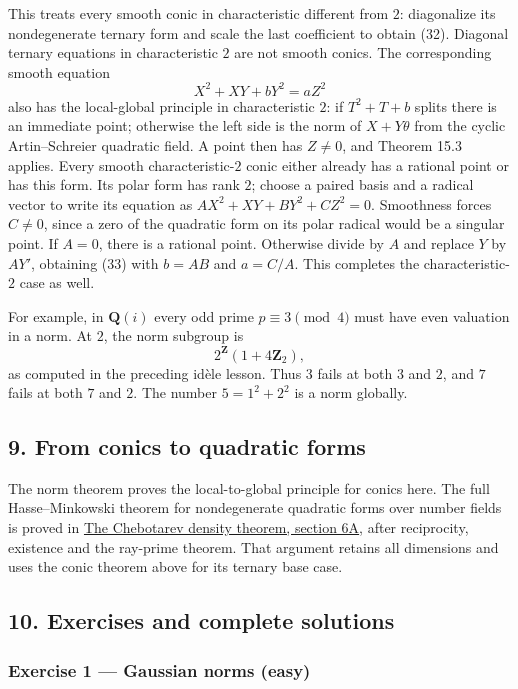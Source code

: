 \documentclass[11pt,a4paper]{article}
\begin{document}
This treats every smooth conic in characteristic different from \(2\):
diagonalize its nondegenerate ternary form and scale the last
coefficient to obtain (32). Diagonal ternary equations in characteristic
\(2\) are not smooth conics. The corresponding smooth equation \[
X^2+XY+bY^2=aZ^2
\tag{33}
\] also has the local-global principle in characteristic \(2\): if
\(T^2+T+b\) splits there is an immediate point; otherwise the left side
is the norm of \(X+Y\theta\) from the cyclic Artin--Schreier quadratic
field. A point then has \(Z\ne0\), and Theorem 15.3 applies. Every
smooth characteristic-\(2\) conic either already has a rational point or
has this form. Its polar form has rank \(2\); choose a paired basis and
a radical vector to write its equation as \(A X^2+XY+B Y^2+C Z^2=0\).
Smoothness forces \(C\ne0\), since a zero of the quadratic form on its
polar radical would be a singular point. If \(A=0\), there is a rational
point. Otherwise divide by \(A\) and replace \(Y\) by \(A Y'\),
obtaining (33) with \(b=AB\) and \(a=C/A\). This completes the
characteristic-\(2\) case as well.

For example, in \(\mathbf Q(i)\) every odd prime \(p\equiv3\pmod4\) must
have even valuation in a norm. At \(2\), the norm subgroup is \[
2^{\mathbf Z}(1+4\mathbf Z_2),
\] as computed in the preceding idèle lesson. Thus \(3\) fails at both
\(3\) and \(2\), and \(7\) fails at both \(7\) and \(2\). The number
\(5=1^2+2^2\) is a norm globally.

\subsection{9. From conics to quadratic
forms}\label{from-conics-to-quadratic-forms}

The norm theorem proves the local-to-global principle for conics here.
The full Hasse--Minkowski theorem for nondegenerate quadratic forms over
number fields is proved in
\href{the-chebotarev-density-theorem.md\#6a-general-quadratic-forms}{The
Chebotarev density theorem, section 6A}, after reciprocity, existence
and the ray-prime theorem. That argument retains all dimensions and uses
the conic theorem above for its ternary base case.

\subsection{10. Exercises and complete
solutions}\label{exercises-and-complete-solutions}

\subsubsection{Exercise 1 --- Gaussian norms
(easy)}\label{exercise-1-gaussian-norms-easy}
\end{document}
